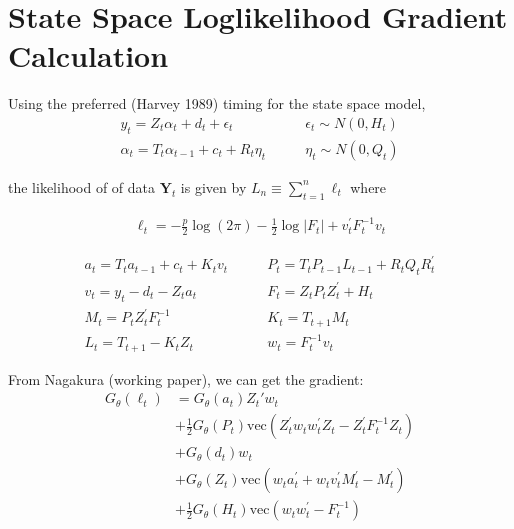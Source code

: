 \documentclass[12pt]{article}
\newcommand{\Gt}{G_\theta}
\newcommand{\vecop}[0]{\text{vec}}
\begin{document}
\section*{State Space Loglikelihood Gradient Calculation}
Using the preferred (Harvey 1989) timing for the state space model,
\begin{align*} 
y_t = Z_t \alpha_t + d_t + \epsilon_t &\qquad \epsilon_t \sim N(0,H_t) \\ 
\alpha_{t} = T_t \alpha_{t-1} + c_t + R_t \eta_t &\qquad \eta_t \sim N(0, Q_t)
\end{align*}

the likelihood of of data $\mathbf{Y}_t$ is given by $L_n \equiv \sum_{t=1}^n \ell_t$ where 

\begin{align*}
\ell_t = -\frac{p}{2} \log(2\pi) - \frac{1}{2} \log|F_t| + v_t^\prime F_t^{-1}v_t
\end{align*}

\begin{align*}
a_t = T_t a_{t-1} + c_t + K_t v_t &\qquad
P_t = T_t P_{t-1}L_{t-1} + R_t Q_t R_t^\prime \\
v_t = y_t - d_t - Z_ta_t &\qquad
F_t = Z_t P_t Z_t^\prime + H_t \\
M_t = P_t Z_t^\prime F_t^{-1} &\qquad
K_t = T_{t+1} M_t \\
L_t = T_{t+1} - K_t Z_t &\qquad
w_t = F_t^{-1} v_t 
\end{align*} 


From Nagakura (working paper), we can get the gradient:
\begin{align*}
\Gt(\ell_t) &= \Gt(a_t) Z_t' w_t  \\
 &+ \frac{1}{2} \Gt(P_t) \vecop (Z_t^\prime w_t w_t^\prime Z_t - Z_t^\prime F_t^{-1} Z_t) \\
 &+ \Gt(d_t) w_t \\
 &+ \Gt(Z_t) \vecop (w_t a_t^\prime + w_t v_t^\prime M_t^\prime - M_t^\prime) \\
 &+ \frac{1}{2} \Gt(H_t) \vecop (w_t w_t^\prime - F_t^{-1})
\end{align*}
\end{document}
